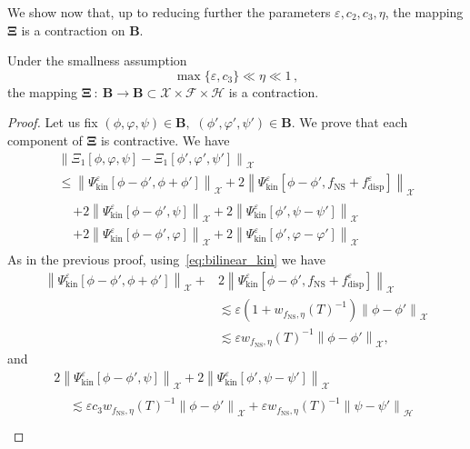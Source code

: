 \documentclass[10pt]{amsart}
\theoremstyle{definition}\newtheorem{defi}[theo]{Definition}\newtheorem{rema}[theo]{Remark}\newtheorem{exam}[theo]{Example}\newtheorem{exem}[theo]{Example}\newtheorem{nota}[theo]{Notation}
\newcommand{\ns}{\mathrm{NS}}
\newcommand{\kin}{\mathrm{kin}}
\newcommand{\disp}{\mathrm{disp}}
\newcommand{\FFF}{\mathscr{F}}
\newcommand{\HHH}{\mathscr{H}}
\newcommand{\GGG}{\mathscr{X}}
\newcommand{\SSSs}{\HHH}
\newcommand{\SSSl}{\GGG}
\newcommand{\SSSm}{\FFF}
\renewcommand*\le{\leqslant}
\newcommand*\eps{{\varepsilon}}
\begin{document}
We show now that, up to reducing further the parameters $\eps,c_2,c_3,\eta$, the mapping $\bm{\Xi}$ is a contraction on $\bm{B}$.

\begin{prop}
Under the smallness assumption
\[
\max\{ \eps, c_3 \} \ll \eta \ll 1\,,
\]
the mapping $\bm{\Xi}\::\:\bm{B} \to \bm{B} \subset \SSSl\times \SSSm \times \SSSs$ is a contraction.
\end{prop}

\begin{proof}
Let us fix $(\phi,\varphi,\psi) \in \bm{B},$ $(\phi',\varphi',\psi') \in \bm{B}$. We prove that each component of $\bm{\Xi}$ is contractive. We have
\begin{multline*}
\left\| \Xi_1[\phi, \varphi, \psi]  - \Xi_1\left[\phi', \varphi', \psi'\right] \right\|_{ \SSSl } \\
\le  \left\| \Psi^\eps_\kin\left[\phi - \phi', \phi + \phi'\right] \right\|_{\SSSl} + 2 \left\| \Psi^\eps_\kin\left[\phi - \phi', f_\ns + f^\eps_\disp\right] \right\|_{ \SSSl } \\
\begin{aligned}
& + 2 \left\| \Psi^\eps_\kin\left[\phi - \phi', \psi\right] \right\|_{ \SSSl } + 2 \left\| \Psi^\eps_\kin\left[\phi', \psi - \psi'\right] \right\|_{ \SSSl } \\
& + 2 \left\| \Psi^\eps_\kin\left[\phi - \phi', \varphi\right] \right\|_{ \SSSl } + 2 \left\| \Psi^\eps_\kin\left[\phi', \varphi - \varphi'\right]\right\|_{ \SSSl }
\end{aligned}
\end{multline*}
As in the previous proof, using~\eqref{eq:bilinear_kin} we have
\begin{align*}
\left\| \Psi^\eps_\kin\left[\phi - \phi', \phi + \phi'\right] \right\|_{\SSSl}  +& 2 \left\| \Psi^\eps_\kin\left[\phi - \phi', f_\ns + f^\eps_\disp\right] \right\|_{ \SSSl } \\
& \lesssim \eps \left(1 + w_{f_\ns, \eta}(T)^{-1} \right) \left\| \phi - \phi' \right\|_{ \SSSl } \\
& \lesssim \eps w_{f_\ns, \eta}(T)^{-1} \left\| \phi - \phi' \right\|_{ \SSSl },
\end{align*}
and
\begin{multline*}
2 \left\| \Psi^\eps_\kin\left[\phi - \phi', \psi\right] \right\|_{ \SSSl } + 2 \left\| \Psi^\eps_\kin\left[\phi', \psi - \psi'\right] \right\|_{ \SSSl } \\
\begin{aligned}
&\lesssim \eps c_3 w_{f_\ns, \eta}(T)^{-1} \left\| \phi - \phi' \right\|_{ \SSSl } + \eps w_{f_\ns, \eta}(T)^{-1} \left\| \psi - \psi' \right\|_{ \SSSs } \\

\end{aligned}
\end{multline*}
\end{proof}
\end{document}
